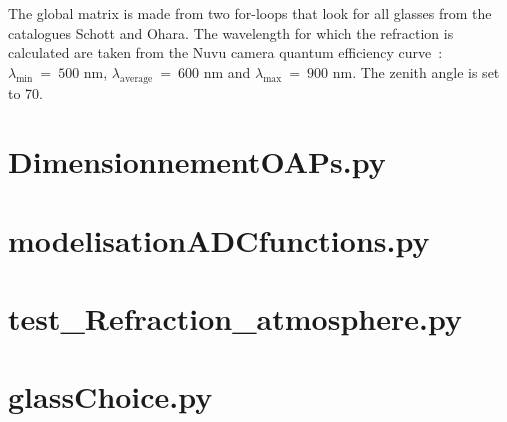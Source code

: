 The global matrix is made from two for-loops that look for all glasses from the catalogues Schott and Ohara. The wavelength for which the refraction is calculated are taken from the Nuvu camera quantum efficiency curve~: $\lambda_\text{min}~=~500$ nm, $\lambda_\text{average}~=~600$ nm and $\lambda_\text{max}~=~900$ nm. The zenith angle is set to 70\degree.


\newpage
\section{DimensionnementOAPs.py}\label{app:DimensionnementOAPs}


\section{modelisationADCfunctions.py}\label{app:modelisationADCfunctions}
%

\section{test\_Refraction\_atmosphere.py}\label{app:test_Refraction_atmosphere}
%

\section{glassChoice.py}\label{app:glassChoice}
%




















